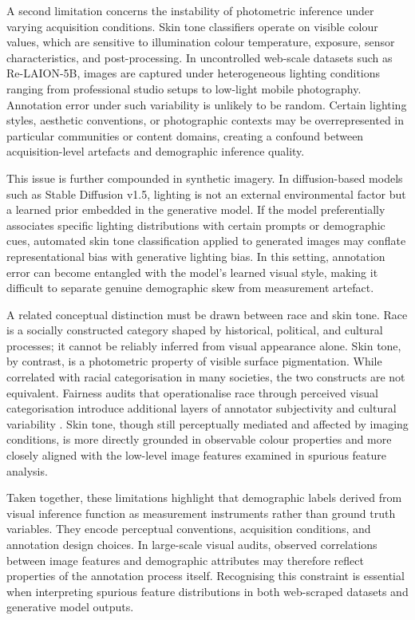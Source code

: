 A second limitation concerns the instability of photometric inference under varying acquisition conditions. Skin tone classifiers operate on visible colour values, which are sensitive to illumination colour temperature, exposure, sensor characteristics, and post-processing. In uncontrolled web-scale datasets such as Re-LAION-5B, images are captured under heterogeneous lighting conditions ranging from professional studio setups to low-light mobile photography. Annotation error under such variability is unlikely to be random. Certain lighting styles, aesthetic conventions, or photographic contexts may be overrepresented in particular communities or content domains, creating a confound between acquisition-level artefacts and demographic inference quality.

This issue is further compounded in synthetic imagery. In diffusion-based models such as Stable Diffusion v1.5, lighting is not an external environmental factor but a learned prior embedded in the generative model. If the model preferentially associates specific lighting distributions with certain prompts or demographic cues, automated skin tone classification applied to generated images may conflate representational bias with generative lighting bias. In this setting, annotation error can become entangled with the model’s learned visual style, making it difficult to separate genuine demographic skew from measurement artefact.

A related conceptual distinction must be drawn between race and skin tone. Race is a socially constructed category shaped by historical, political, and cultural processes; it cannot be reliably inferred from visual appearance alone. Skin tone, by contrast, is a photometric property of visible surface pigmentation. While correlated with racial categorisation in many societies, the two constructs are not equivalent. Fairness audits that operationalise race through perceived visual categorisation introduce additional layers of annotator subjectivity and cultural variability \cite{Raji_2019_ActionableAuditing}. Skin tone, though still perceptually mediated and affected by imaging conditions, is more directly grounded in observable colour properties and more closely aligned with the low-level image features examined in spurious feature analysis.

Taken together, these limitations highlight that demographic labels derived from visual inference function as measurement instruments rather than ground truth variables. They encode perceptual conventions, acquisition conditions, and annotation design choices. In large-scale visual audits, observed correlations between image features and demographic attributes may therefore reflect properties of the annotation process itself. Recognising this constraint is essential when interpreting spurious feature distributions in both web-scraped datasets and generative model outputs.


